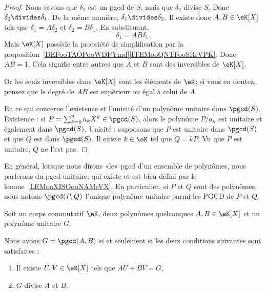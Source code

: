 \begin{proof}
	Nous savons que \( \delta_1\) est un pgcd de \( S\), mais que \( \delta_2\) divise \( S\). Donc \( \delta_2\divides \delta_1\). De la même manière, \( \delta_1\divides \delta_2\). Il existe donc \( A,B\in \eK[X]\) tels que \( \delta_1=A\delta_2\) et \( \delta_2=B\delta_1\). En substituant,
	\begin{equation}
		\delta_1=AB\delta_1.
	\end{equation}
	Mais \( \eK[X]\) possède la propriété de simplification par la proposition~\ref{DEFooTAOPooWDPYmd}\ref{ITEMooQNTFooSRrVPK}. Donc \( AB=1\). Cela signifie entre autres que \( A\) et \( B\) sont des inversibles de \( \eK[X]\).

	Or les seuls inversibles dans \( \eK[X]\) sont les éléments de \( \eK\); si vous en doutez, pensez que le degré de \( AB\) est supérieur ou égal à celui de \( A\).

	En ce qui concerne l'existence et l'unicité d'un polynôme unitaire dans \( \pgcd(S)\). Existence : si \( P=\sum_{k=0}^na_kX^k\in \pgcd(S)\), alors le polynôme \( P/a_n\) est unitaire et également dans \( \pgcd(S)\). Unicité : supposons que \( P\) est unitaire dans \( \pgcd(S)\) et que \( Q\) est dans \( \pgcd(S)\). Il existe \( k\in \eK\) tel que \( Q=kP\). Vu que \( P\) est unitaire, \( Q\) ne l'est pas.
\end{proof}

\begin{normaltext}      \label{NORMooUJDJooWfijxT}
	En général, lorsque nous dirons «le» pgcd d'un ensemble de polynômes, nous parlerons du pgcd unitaire, qui existe et est bien défini par le lemme~\ref{LEMooXISOooNAMeVX}. En particulier, si \( P\) et \( Q\) sont des polynômes, nous notons \( \pgcd(P,Q)\) l'unique polynôme unitaire parmi les PGCD de \( P\) et \( Q\).
\end{normaltext}

\begin{lemma}        \label{LEMooIAGMooHUQtUs}
	Soit un corps commutatif \( \eK\), deux polynômes quelconques \( A,B\in \eK[X]\) et un polynôme unitaire \( G\).

	Nous avons \( G=\pgcd(A,B)\) si et seulement si les deux conditions suivantes sont satisfaites :
	\begin{enumerate}
		\item
		      Il existe \( U,V\in \eK[X]\) tels que \( AU+BV=G\),
		\item
		      \( G\) divise \( A\) et \( B\).
	\end{enumerate}
\end{lemma}

